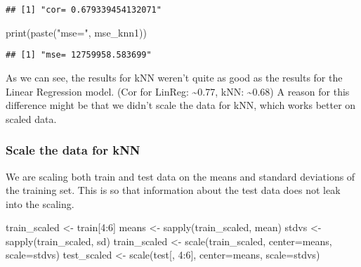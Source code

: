 \documentclass[
]{article}
\newenvironment{Shaded}{\begin{snugshade}}{\end{snugshade}}
\newcommand{\AttributeTok}[1]{\textcolor[rgb]{0.77,0.63,0.00}{#1}}
\newcommand{\DecValTok}[1]{\textcolor[rgb]{0.00,0.00,0.81}{#1}}
\newcommand{\FunctionTok}[1]{\textcolor[rgb]{0.00,0.00,0.00}{#1}}
\newcommand{\NormalTok}[1]{#1}
\newcommand{\OtherTok}[1]{\textcolor[rgb]{0.56,0.35,0.01}{#1}}
\newcommand{\SpecialCharTok}[1]{\textcolor[rgb]{0.00,0.00,0.00}{#1}}
\newcommand{\StringTok}[1]{\textcolor[rgb]{0.31,0.60,0.02}{#1}}
\begin{document}
\begin{verbatim}
## [1] "cor= 0.679339454132071"
\end{verbatim}

\begin{Shaded}
\begin{Highlighting}[]
\FunctionTok{print}\NormalTok{(}\FunctionTok{paste}\NormalTok{(}\StringTok{"mse="}\NormalTok{, mse\_knn1))}
\end{Highlighting}
\end{Shaded}

\begin{verbatim}
## [1] "mse= 12759958.583699"
\end{verbatim}

As we can see, the results for kNN weren't quite as good as the results
for the Linear Regression model. (Cor for LinReg: \textasciitilde0.77,
kNN: \textasciitilde0.68) A reason for this difference might be that we
didn't scale the data for kNN, which works better on scaled data.

\hypertarget{scale-the-data-for-knn}{%
\subsubsection{Scale the data for kNN}\label{scale-the-data-for-knn}}

We are scaling both train and test data on the means and standard
deviations of the training set. This is so that information about the
test data does not leak into the scaling.

\begin{Shaded}
\begin{Highlighting}[]
\NormalTok{train\_scaled }\OtherTok{\textless{}{-}}\NormalTok{ train[}\DecValTok{4}\SpecialCharTok{:}\DecValTok{6}\NormalTok{]}
\NormalTok{means }\OtherTok{\textless{}{-}} \FunctionTok{sapply}\NormalTok{(train\_scaled, mean)}
\NormalTok{stdvs }\OtherTok{\textless{}{-}} \FunctionTok{sapply}\NormalTok{(train\_scaled, sd)}
\NormalTok{train\_scaled }\OtherTok{\textless{}{-}} \FunctionTok{scale}\NormalTok{(train\_scaled, }\AttributeTok{center=}\NormalTok{means, }\AttributeTok{scale=}\NormalTok{stdvs)}
\NormalTok{test\_scaled }\OtherTok{\textless{}{-}} \FunctionTok{scale}\NormalTok{(test[, }\DecValTok{4}\SpecialCharTok{:}\DecValTok{6}\NormalTok{], }\AttributeTok{center=}\NormalTok{means, }\AttributeTok{scale=}\NormalTok{stdvs)}
\end{Highlighting}
\end{Shaded}
\end{document}
